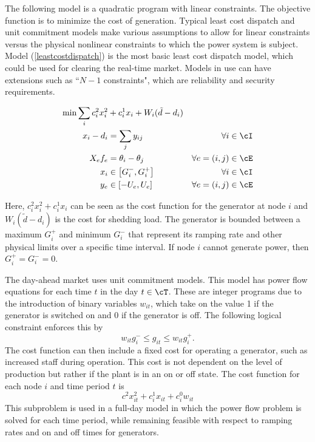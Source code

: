 The following model is a quadratic program with linear constraints.  The objective function is to minimize the cost of generation.  Typical least cost dispatch and unit commitment models make various assumptions to allow for linear constraints versus the physical nonlinear constraints to which the power system is subject.  Model (\ref{leastcostdispatch}) is the most basic least cost dispatch model, which could be used for clearing the real-time market.  Models in use can have extensions such as ``$N-1$ constraints", which are reliability and security requirements.

\begin{subequations}
\begin{align}
 \min \sum_i c^2_i x_i^2 &+ c^1_i x_i	+ W_i(\tilde{d} - d_i)&	\\
x_i - d_i &= \sum_j y_{ij}	&	\forall i \in \cI 	\\
X_{e} f_{e} &= \theta_i - \theta_j & \forall e=(i,j) \in \cE \\
x_i  &\in \left[ G_i^- , G_i^+ \right]		&	\forall i \in \cI 	\\
y_{e} &\in \left[ -U_{e}, U_{e} \right]	&	\forall e=(i,j) \in \cE 
\end{align}
\label{leastcostdispatch}
\end{subequations}

Here, $c^2_i x_i^2 + c^1_i x_i$ can be seen as the cost function for the generator at node $i$ and $W_i(\tilde{d} - d_i)$ is the cost for shedding load.  The generator is bounded between a maximum $G_i^+$ and minimum $G_i^-$ that represent its ramping rate and other physical limits over a specific time interval.    If node $i$ cannot generate power, then $G_i^+=G_i^-=0$.

The day-ahead market uses unit commitment models.  This model has power flow equations for each time $t$ in the day $t \in \cT$.  These are integer programs due to the introduction of binary variables $w_{it}$, which take on the value 1 if the generator is switched on and 0 if the generator is off.  The following logical constraint enforces this by
\begin{equation}
w_{it} g_i^- \le g_{it} \le w_{it} g_i^+.
\end{equation}
The cost function can then include a fixed cost for operating a generator, such as increased staff during operation.  This cost is not dependent on the level of production but rather if the plant is in an on or off state.  The cost function for each node $i$ and time period $t$ is
\begin{equation}
c^2 x_{it}^2 + c^1_i x_{it} + c^0_i w_{it}
\end{equation}
This subproblem is used in a full-day model in which the power flow problem is solved for each time period, while remaining feasible with respect to ramping rates and on and off times for generators.






